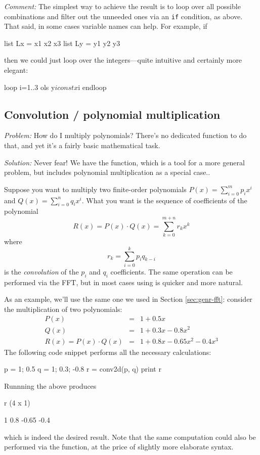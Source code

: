 \emph{Comment:} The simplest way to achieve the result is to loop over
all possible combinations and filter out the unneeded ones via an
\texttt{if} condition, as above. That said, in some cases variable
names can help. For example, if
\begin{code}
  list Lx = x1 x2 x3
  list Ly = y1 y2 y3
\end{code}
then we could just loop over the integers---quite intuitive and certainly
more elegant:
\begin{code}
  loop i=1..3
    ols y$i const x$i
  endloop
\end{code}

\subsection{Convolution / polynomial multiplication}

\emph{Problem:} How do I multiply polynomials? There's no dedicated
function to do that, and yet it's a fairly basic mathematical task.

\emph{Solution:} Never fear! We have the  function, which
is a tool for a more general problem, but includes polynomial
multiplication as a special case..

Suppose you want to multiply two finite-order polynomials $P(x) =
\sum_{i=0}^m p_i x^i$ and $Q(x) = \sum_{i=0}^n q_i x^i$. What you want
is the sequence of coefficients of the polynomial
\[
  R(x) = P(x) \cdot Q(x) = \sum_{k=0}^{m+n} r_k x^k
\]
where
\[
  r_k = \sum_{i=0}^k p_i q_{k-i}
\]
is the \emph{convolution} of the $p_i$ and $q_i$ coefficients. The
same operation can be performed via the FFT, but in most cases using
 is quicker and more natural.

As an example, we'll use the same one we used in Section
\ref{sec:genr-fft}: consider the multiplication of two polynomials:
\begin{eqnarray*}
  P(x) & = & 1 + 0.5 x \\
  Q(x) & = & 1 + 0.3 x - 0.8 x^2 \\
  R(x) = P(x) \cdot Q(x) & = & 1 + 0.8 x - 0.65 x^2 - 0.4 x^3
\end{eqnarray*}
The following code snippet performs all the necessary calculations:
\begin{code}
p = {1; 0.5}
q = {1; 0.3; -0.8}
r = conv2d(p, q)
print r
\end{code}
Runnning the above produces
\begin{code}
r (4 x 1)

      1
    0.8
  -0.65
   -0.4
\end{code}
which is indeed the desired result. Note that the same computation
could also be performed via the  function, at the price of
slightly more elaborate syntax.

